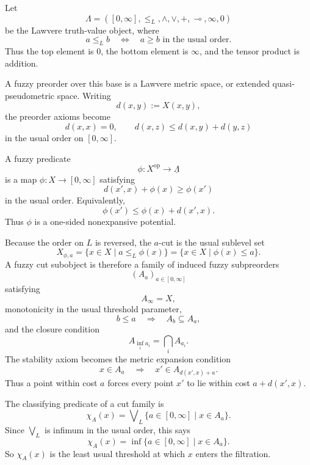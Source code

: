 \begin{example}
\label{ex:cut-subobjects-lawvere}
    Let
    \[
        \Lambda=([0,\infty],\leq_L,\wedge,\vee,+,\multimap,\infty,0)
    \]
    be the Lawvere truth-value object, where
    \[
        a\leq_L b
        \quad\Longleftrightarrow\quad
        a\geq b
        \text{ in the usual order}.
    \]
    Thus the top element is \(0\), the bottom element is \(\infty\), and the tensor product is addition.

    A fuzzy preorder over this base is a Lawvere metric space, or extended quasi-pseudometric space. Writing
    \[
        d(x,y):=X(x,y),
    \]
    the preorder axioms become
    \[
        d(x,x)=0,
        \qquad
        d(x,z)\leq d(x,y)+d(y,z)
    \]
    in the usual order on \([0,\infty]\).

    A fuzzy predicate
    \[
        \phi:X^{\mathrm{op}}\to\underline{\Lambda}
    \]
    is a map \(\phi:X\to[0,\infty]\) satisfying
    \[
        d(x',x)+\phi(x)\geq \phi(x')
    \]
    in the usual order. Equivalently,
    \[
        \phi(x')\leq \phi(x)+d(x',x).
    \]
    Thus \(\phi\) is a one-sided nonexpansive potential.

    Because the order on \(L\) is reversed, the \(a\)-cut is the usual sublevel set
    \[
        X_{\phi,a}
        =
        \{x\in X\mid a\leq_L \phi(x)\}
        =
        \{x\in X\mid \phi(x)\leq a\}.
    \]
    A fuzzy cut subobject is therefore a family of induced fuzzy subpreorders
    \[
        (A_a)_{a\in[0,\infty]}
    \]
    satisfying
    \[
        A_\infty=X,
    \]
    monotonicity in the usual threshold parameter,
    \[
        b\leq a
        \quad\Longrightarrow\quad
        A_b\subseteq A_a,
    \]
    and the closure condition
    \[
        A_{\inf_i a_i}
        =
        \bigcap_i A_{a_i}.
    \]
    The stability axiom becomes the metric expansion condition
    \[
        x\in A_a
        \quad\Longrightarrow\quad
        x'\in A_{d(x',x)+a}.
    \]
    Thus a point within cost \(a\) forces every point \(x'\) to lie within cost \(a+d(x',x)\).

    The classifying predicate of a cut family is
    \[
        \chi_A(x)
        =
        \bigvee\nolimits_L\{a\in[0,\infty]\mid x\in A_a\}.
    \]
    Since \(\bigvee_L\) is infimum in the usual order, this says
    \[
        \chi_A(x)
        =
        \inf\{a\in[0,\infty]\mid x\in A_a\}.
    \]
    So \(\chi_A(x)\) is the least usual threshold at which \(x\) enters the filtration.


\end{example}

